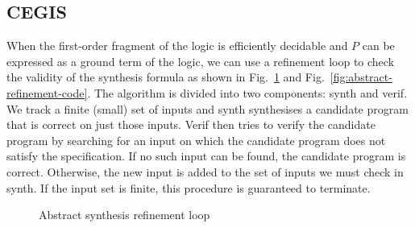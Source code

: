 \documentclass[a4paper]{llncs}
\begin{document}
\subsection{CEGIS}

When the first-order fragment of the logic is efficiently decidable and $P$ can be
expressed as a ground term of the logic, we can use a refinement loop to check the
validity of the synthesis formula as shown in Fig.~\ref{fig:abstract-refinement} and
Fig.~\ref{fig:abstract-refinement-code}.  The algorithm is divided into two
components: {\sc synth} and {\sc verif}.  We track a finite (small) set of inputs
and {\sc synth} synthesises a candidate program that is correct on just those inputs.
{\sc Verif} then tries to verify the candidate program by searching for an input on
which the candidate program does not satisfy the specification.  If no such input
can be found, the candidate program is correct.  Otherwise, the new input is added
to the set of inputs we must check in {\sc synth}.  If the input set is finite, this
procedure is guaranteed to terminate.

\begin{figure}
 \centering
 
 \caption{Abstract synthesis refinement loop
 \label{fig:abstract-refinement}}
\end{figure}
\end{document}
